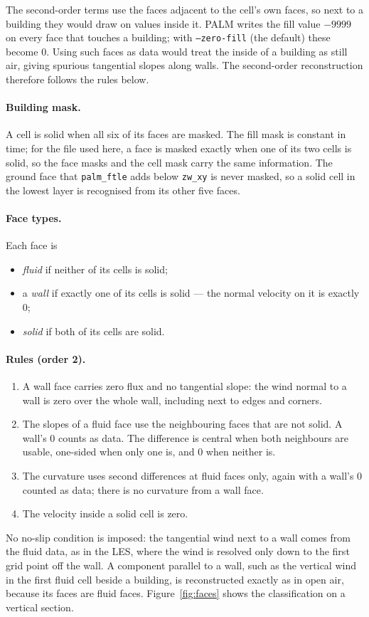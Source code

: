 \documentclass[11pt,a4paper]{article}
\begin{document}
The second-order terms use the faces adjacent to the cell's own faces, so next
to a building they would draw on values inside it. PALM writes the fill value
$-9999$ on every face that touches a building; with \texttt{--zero-fill} (the
default) these become 0. Using such faces as data would treat the inside of a
building as still air, giving spurious tangential slopes along walls. The
second-order reconstruction therefore follows the rules below.

\paragraph{Building mask.} A cell is solid when all six of its faces are
masked. The fill mask is constant in time; for the file used here, a face is
masked exactly when one of its two cells is solid, so the face masks and the
cell mask carry the same information. The ground face that \texttt{palm\_ftle}
adds below \texttt{zw\_xy} is never masked, so a solid cell in the lowest layer
is recognised from its other five faces.

\paragraph{Face types.} Each face is
\begin{itemize}
  \item \emph{fluid} if neither of its cells is solid;
  \item a \emph{wall} if exactly one of its cells is solid --- the normal velocity
        on it is exactly 0;
  \item \emph{solid} if both of its cells are solid.
\end{itemize}

\paragraph{Rules (order 2).}
\begin{enumerate}
  \item A wall face carries zero flux and no tangential slope: the wind
        normal to a wall is zero over the whole wall, including next to
        edges and corners.
  \item The slopes of a fluid face use the neighbouring faces that are not
        solid. A wall's 0 counts as data. The difference is central when both
        neighbours are usable, one-sided when only one is, and 0 when neither
        is.
  \item The curvature uses second differences at fluid faces only, again with a
        wall's 0 counted as data; there is no curvature from a wall face.
  \item The velocity inside a solid cell is zero.
\end{enumerate}
No no-slip condition is imposed: the tangential wind next to a wall comes from
the fluid data, as in the LES, where the wind is resolved only down to the
first grid point off the wall. A component parallel to a wall, such as the
vertical wind in the first fluid cell beside a building, is reconstructed
exactly as in open air, because its faces are fluid faces. Figure~\ref{fig:faces}
shows the classification on a vertical section.
\end{document}
